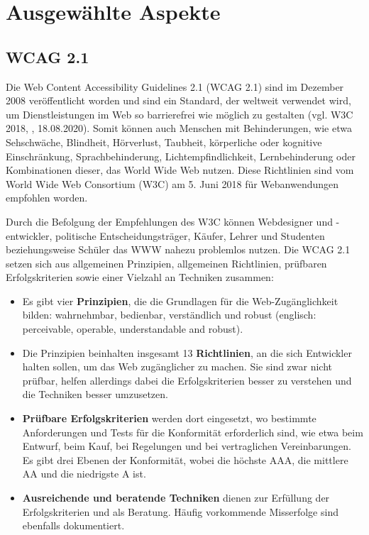\chapter{Ausgewählte Aspekte}
\section{WCAG 2.1}
\label{wcag_2_1}
Die Web Content Accessibility Guidelines 2.1 (WCAG 2.1) sind im Dezember 2008 veröffentlicht worden und sind ein Standard, der weltweit verwendet wird, um Dienstleistungen im Web so barrierefrei wie möglich zu gestalten (vgl. W3C 2018, \cite{wcag_2_1_2018}, 18.08.2020). Somit können auch Menschen mit Behinderungen, wie etwa Sehschwäche, Blindheit, Hörverlust, Taubheit, körperliche oder kognitive Einschränkung, Sprachbehinderung, Lichtempfindlichkeit, Lernbehinderung oder Kombinationen dieser, das World Wide Web nutzen. Diese Richtlinien sind vom World Wide Web Consortium (W3C) am 5. Juni 2018 für Webanwendungen empfohlen worden.

Durch die Befolgung der Empfehlungen des W3C können Webdesigner und -entwickler, politische Entscheidungsträger, Käufer, Lehrer und Studenten beziehungsweise Schüler das WWW nahezu problemlos nutzen. Die WCAG 2.1 setzen sich aus allgemeinen Prinzipien, allgemeinen Richtlinien, prüfbaren Erfolgskriterien sowie einer Vielzahl an Techniken zusammen:

\begin{itemize}
	\item Es gibt vier \textbf{Prinzipien}, die die Grundlagen für die Web-Zugänglichkeit bilden: wahrnehmbar, bedienbar, verständlich und robust (englisch: perceivable, operable, understandable and robust).
	\item Die Prinzipien beinhalten insgesamt 13 \textbf{Richtlinien}, an die sich Entwickler halten sollen, um das Web zugänglicher zu machen. Sie sind zwar nicht prüfbar, helfen allerdings dabei die Erfolgskriterien besser zu verstehen und die Techniken besser umzusetzen.
	\item \textbf{Prüfbare Erfolgskriterien} werden dort eingesetzt, wo bestimmte Anforderungen und Tests für die Konformität erforderlich sind, wie etwa beim Entwurf, beim Kauf, bei Regelungen und bei vertraglichen Vereinbarungen. Es gibt drei Ebenen der Konformität, wobei die höchste AAA, die mittlere AA und die niedrigste A ist.
	\item \textbf{Ausreichende und beratende Techniken} dienen zur Erfüllung der Erfolgskriterien und als Beratung. Häufig vorkommende Misserfolge sind ebenfalls dokumentiert.
\end{itemize}

